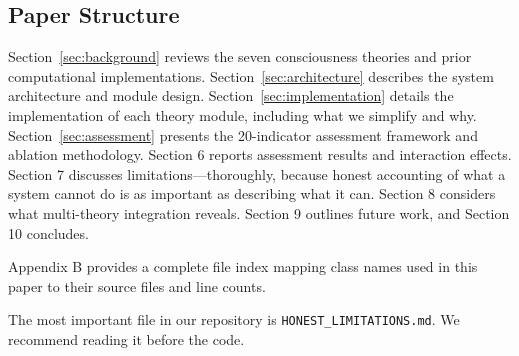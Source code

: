 \subsection{Paper Structure}

Section~\ref{sec:background} reviews the seven consciousness theories and prior computational implementations. Section~\ref{sec:architecture} describes the system architecture and module design. Section~\ref{sec:implementation} details the implementation of each theory module, including what we simplify and why. Section~\ref{sec:assessment} presents the 20-indicator assessment framework and ablation methodology. Section 6 reports assessment results and interaction effects. Section 7 discusses limitations---thoroughly, because honest accounting of what a system cannot do is as important as describing what it can. Section 8 considers what multi-theory integration reveals. Section 9 outlines future work, and Section 10 concludes.

Appendix B provides a complete file index mapping class names used in this paper to their source files and line counts.

The most important file in our repository is \texttt{HONEST\_LIMITATIONS.md}. We recommend reading it before the code.
